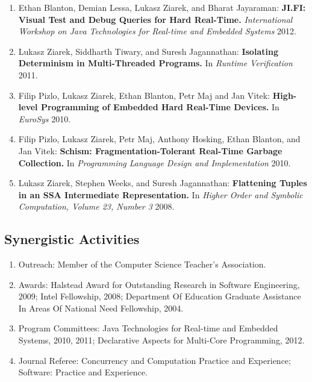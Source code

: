\documentclass[times,11pt]{article}
\begin{document}
\noindent
\begin{enumerate}\setlength{\itemsep}{\myspace}

\item Ethan Blanton, Demian Lessa, Lukasz Ziarek, and Bharat Jayaraman:                                                                                                 
{\bf JI.FI: Visual Test and Debug Queries for Hard Real-Time.}                                                                                                          
{\it International Workshop on Java Technologies for Real-time and Embedded Systems} 2012.  

\item Lukasz Ziarek, Siddharth Tiwary, and Suresh Jagannathan:
{\bf Isolating Determinism in Multi-Threaded Programs.}
In \emph{Runtime Verification} 2011.

\item Filip Pizlo, Lukasz Ziarek, Ethan Blanton, Petr Maj and Jan Vitek:
{\bf High-level Programming of Embedded Hard Real-Time Devices.}
In \emph{EuroSys} 2010.

\item Filip Pizlo, Lukasz Ziarek, Petr Maj, Anthony Hosking, Ethan Blanton, and Jan Vitek:
{\bf Schism: Fragmentation-Tolerant Real-Time Garbage Collection.}
In \emph{Programming Language Design and Implementation} 2010.

\item Lukasz Ziarek, Stephen Weeks, and Suresh Jagannathan:
{\bf Flattening Tuples in an SSA Intermediate Representation.}
In \emph{Higher Order and Symbolic Computation, Volume 23, Number 3} 2008.

\end{enumerate}


\subsection*{Synergistic Activities}
\noindent
\begin{enumerate}\setlength{\itemsep}{\myspace}
\item Outreach: Member of the Computer Science Teacher's Association.
\item Awards: Halstead Award for Outstanding Research in Software Engineering, 2009;
Intel Fellowship, 2008; 
Department Of Education Graduate Assistance In Areas Of National Need Fellowship, 2004.
\item Program Committees: Java Technologies for Real-time and Embedded Systems, 2010, 2011; 
Declarative Aspects for Multi-Core Programming, 2012.
\item Journal Referee: Concurrency and Computation Practice and Experience; Software: Practice and Experience.
\end{enumerate}
\end{document}
